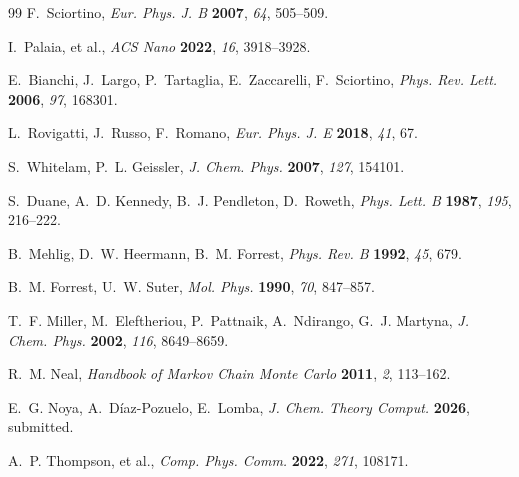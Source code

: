 \documentclass[11pt,a4paper]{article}
\begin{document}
\begin{thebibliography}{99}
F.~Sciortino, \textit{Eur. Phys. J. B} \textbf{2007}, \textit{64}, 505--509.

I.~Palaia, et al., \textit{ACS Nano} \textbf{2022}, \textit{16}, 3918--3928.

E.~Bianchi, J.~Largo, P.~Tartaglia, E.~Zaccarelli, F.~Sciortino, \textit{Phys. Rev. Lett.} \textbf{2006}, \textit{97}, 168301.

L.~Rovigatti, J.~Russo, F.~Romano, \textit{Eur. Phys. J. E} \textbf{2018}, \textit{41}, 67.

S.~Whitelam, P.~L. Geissler, \textit{J. Chem. Phys.} \textbf{2007}, \textit{127}, 154101.

S.~Duane, A.~D. Kennedy, B.~J. Pendleton, D.~Roweth, \textit{Phys. Lett. B} \textbf{1987}, \textit{195}, 216--222.

B.~Mehlig, D.~W. Heermann, B.~M. Forrest, \textit{Phys. Rev. B} \textbf{1992}, \textit{45}, 679.

B.~M. Forrest, U.~W. Suter, \textit{Mol. Phys.} \textbf{1990}, \textit{70}, 847--857.

T.~F. Miller, M.~Eleftheriou, P.~Pattnaik, A.~Ndirango, G.~J. Martyna, \textit{J. Chem. Phys.} \textbf{2002}, \textit{116}, 8649--8659.

R.~M. Neal, \textit{Handbook of Markov Chain Monte Carlo} \textbf{2011}, \textit{2}, 113--162.

E.~G. Noya, A.~D\'{i}az-Pozuelo, E.~Lomba, \textit{J. Chem. Theory Comput.} \textbf{2026}, submitted.

A.~P. Thompson, et al., \textit{Comp. Phys. Comm.} \textbf{2022}, \textit{271}, 108171.
\end{thebibliography}
\end{document}
